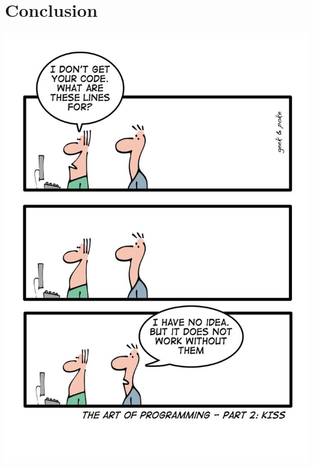 \documentclass{efd-lecture}
\begin{document}
\section{Conclusion}

\begin{frame}
  \begin{center}
  \includegraphics[height=\textheight]{./img/cartoon-1.png}
  \end{center}
\end{frame}
\end{document}
